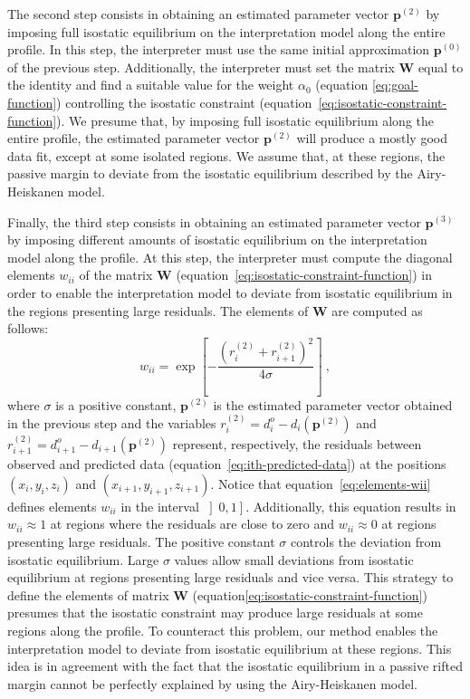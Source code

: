 \documentclass[manuscript]{geophysics}
\begin{document}
The second step consists in obtaining an estimated parameter vector $\mathbf{p}^{(2)}$
by imposing full isostatic equilibrium on the interpretation model along the entire profile.
In this step, the interpreter must use the same initial approximation $\mathbf{p}^{(0)}$
of the previous step. 
Additionally, the interpreter must set the matrix $\mathbf{W}$
equal to the identity and find a suitable value for the weight $\alpha_{0}$ 
(equation \ref{eq:goal-function}) controlling the isostatic constraint 
(equation~\ref{eq:isostatic-constraint-function}).
We presume that, by imposing full isostatic equilibrium along the entire profile,
the estimated parameter vector $\mathbf{p}^{(2)}$ will produce a mostly good data fit,
except at some isolated regions. 
We assume that, at these regions, the passive margin to deviate
from the isostatic equilibrium described by the Airy-Heiskanen model.

Finally, the third step consists in obtaining an estimated parameter vector $\mathbf{p}^{(3)}$
by imposing different amounts of isostatic equilibrium on the interpretation model along the
profile. At this step, the interpreter must compute the diagonal elements 
$w_{ii}$ of the matrix $\mathbf{W}$ (equation~\ref{eq:isostatic-constraint-function}) 
in order to enable the interpretation model to deviate from isostatic equilibrium in 
the regions presenting large residuals. 
The elements of $\mathbf{W}$ are computed as follows:
\begin{equation} \label{eq:elements-wii}
w_{ii} = 
\exp \left[ - \frac{ \left( r_{i}^{(2)} + r_{i+1}^{(2)} \right)^{2}}{4 \sigma} \right] \: ,
\end{equation}
where $\sigma$ is a positive constant, $\mathbf{p}^{(2)}$ is the estimated parameter vector
obtained in the previous step and the variables
$r_{i}^{(2)} = d^{o}_{i} - d_{i} \left( \mathbf{p}^{(2)} \right)$ and 
$r_{i+1}^{(2)} = d^{o}_{i+1} - d_{i+1} \left(\mathbf{p}^{(2)} \right)$ represent,
respectively, the residuals between observed and predicted data
(equation~\ref{eq:ith-predicted-data}) at the positions $(x_{i}, y_{i}, z_{i})$ and 
$(x_{i+1}, y_{i+1}, z_{i+1})$. Notice that equation~\ref{eq:elements-wii} defines elements 
$w_{ii}$ in the interval $\left] 0, 1 \right]$. Additionally, this equation results in 
$w_{ii} \approx 1$ at regions where the residuals are close to zero and 
$w_{ii} \approx 0$ at regions presenting large residuals.
The positive constant $\sigma$ controls the deviation from isostatic equilibrium.
Large $\sigma$ values allow small deviations from isostatic equilibrium at
regions presenting large residuals and vice versa.
This strategy to define the elements of matrix $\mathbf{W}$ 
(equation\ref{eq:isostatic-constraint-function}) presumes that the isostatic constraint may
produce large residuals at some regions along the profile. To counteract this problem,
our method enables the interpretation model to deviate from isostatic equilibrium at these 
regions. This idea is in agreement with the fact that the isostatic equilibrium
in a passive rifted margin cannot be perfectly explained by using the Airy-Heiskanen model.
\end{document}
